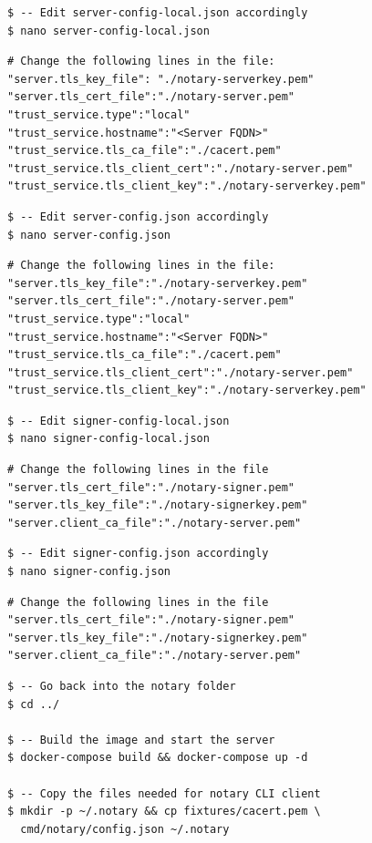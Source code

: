 \documentclass[a4paper,12pt]{article}
\begin{document}
{{\begin{verbatim}
$ -- Edit server-config-local.json accordingly
$ nano server-config-local.json
\end{verbatim}
\begin{verbatim}
# Change the following lines in the file:
"server.tls_key_file": "./notary-serverkey.pem"
"server.tls_cert_file":"./notary-server.pem"
"trust_service.type":"local"
"trust_service.hostname":"<Server FQDN>"
"trust_service.tls_ca_file":"./cacert.pem"
"trust_service.tls_client_cert":"./notary-server.pem"
"trust_service.tls_client_key":"./notary-serverkey.pem"
\end{verbatim}
\begin{verbatim}
$ -- Edit server-config.json accordingly
$ nano server-config.json
\end{verbatim}
\begin{verbatim}
# Change the following lines in the file:
"server.tls_key_file":"./notary-serverkey.pem"
"server.tls_cert_file":"./notary-server.pem"
"trust_service.type":"local"
"trust_service.hostname":"<Server FQDN>"
"trust_service.tls_ca_file":"./cacert.pem"
"trust_service.tls_client_cert":"./notary-server.pem"
"trust_service.tls_client_key":"./notary-serverkey.pem"
\end{verbatim}
\begin{verbatim}
$ -- Edit signer-config-local.json
$ nano signer-config-local.json
\end{verbatim}
\begin{verbatim}
# Change the following lines in the file
"server.tls_cert_file":"./notary-signer.pem"
"server.tls_key_file":"./notary-signerkey.pem"
"server.client_ca_file":"./notary-server.pem"
\end{verbatim}
\begin{verbatim}
$ -- Edit signer-config.json accordingly
$ nano signer-config.json
\end{verbatim}
\begin{verbatim}
# Change the following lines in the file
"server.tls_cert_file":"./notary-signer.pem"
"server.tls_key_file":"./notary-signerkey.pem"
"server.client_ca_file":"./notary-server.pem"
\end{verbatim}
\begin{verbatim}
$ -- Go back into the notary folder
$ cd ../

$ -- Build the image and start the server
$ docker-compose build && docker-compose up -d

$ -- Copy the files needed for notary CLI client
$ mkdir -p ~/.notary && cp fixtures/cacert.pem \
  cmd/notary/config.json ~/.notary


\end{verbatim}}}
\end{document}
